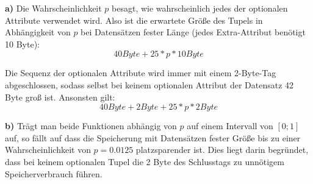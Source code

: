 \documentclass[12pt]{article}
\begin{document}
\textbf{a)} 
Die Wahrscheinlichkeit $p$ besagt, wie wahrscheinlich jedes der optionalen
Attribute verwendet wird.  Also ist die erwartete Größe des Tupels in
Abhängigkeit von $p$ bei Datensätzen fester Länge (jedes Extra-Attribut benötigt
10 Byte):
$$40 Byte + 25 * p * 10 Byte$$

Die Sequenz der optionalen Attribute wird immer mit einem 2-Byte-Tag
abgeschlossen, sodass selbst bei keinem optionalen Attribut der Datensatz 42
Byte groß ist. Ansonsten gilt:
$$40 Byte + 2 Byte + 25*p*2 Byte$$

\textbf{b)}
Trägt man beide Funktionen abhängig von $p$ auf einem Intervall von $[0;1]$ auf,
so fällt auf dass die Speicherung mit Datensätzen fester Größe bis zu einer
Wahrscheinlichkeit von $p=0.0125$ platzsparender ist. Dies liegt darin
begründet, dass bei keinem optionalen Tupel die 2 Byte des Schlusstags zu
unnötigem Speicherverbrauch führen.
\end{document}
